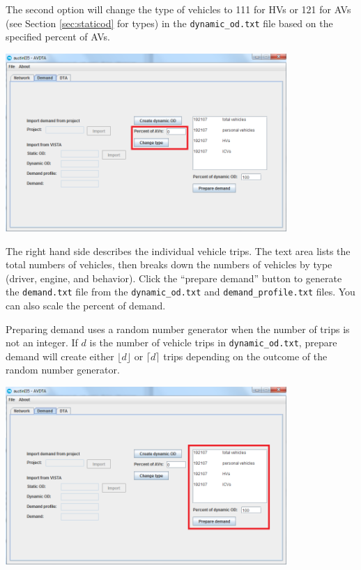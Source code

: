 The second option will change the type of vehicles to 111 for HVs or 121 for AVs (see Section \ref{sec:staticod} for types) in the \texttt{dynamic\_od.txt} file based on the specified percent of AVs. 
\begin{center}
\includegraphics[width=0.8\textwidth]{images/demand3b.png}
\end{center}

The right hand side describes the individual vehicle trips. The text area lists the total numbers of vehicles, then breaks down the numbers of vehicles by type (driver, engine, and behavior). Click the ``prepare demand'' button to generate the \texttt{demand.txt} file from the \texttt{dynamic\_od.txt} and \texttt{demand\_profile.txt} files. You can also scale the percent of demand. 

Preparing demand uses a random number generator when the number of trips is not an integer. If $d$ is the number of vehicle trips in \texttt{dynamic\_od.txt}, prepare demand will create either $\lfloor d\rfloor$ or $\lceil d\rceil$ trips depending on the outcome of the random number generator.
\begin{center}
\includegraphics[width=0.8\textwidth]{images/demand4.png}
\end{center}


